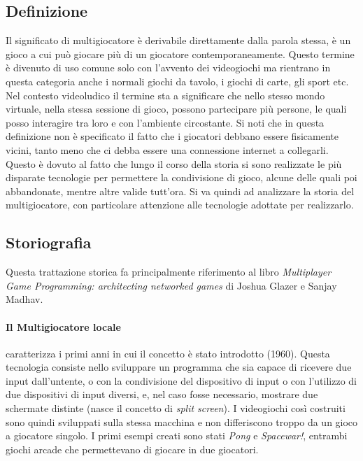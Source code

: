     \subsection{Definizione}\label{subsec:MultiDef}
        Il significato di multigiocatore è derivabile direttamente dalla parola stessa, è un gioco a cui può giocare più di un giocatore contemporaneamente. Questo termine è divenuto 
        di uso comune solo con l'avvento dei videogiochi ma rientrano in questa categoria anche i normali giochi da tavolo, i giochi di carte, gli sport etc.\\
        Nel contesto videoludico il termine sta a significare che nello stesso mondo virtuale, nella stessa sessione di gioco, possono partecipare più persone, le quali posso interagire
        tra loro e con l'ambiente circostante. Si noti che in questa definizione non è specificato il fatto che i giocatori debbano essere fisicamente vicini, tanto meno che ci 
        debba essere una connessione internet a collegarli. Questo è dovuto al fatto che lungo il corso della storia si sono realizzate le più disparate tecnologie per permettere la
        condivisione di gioco, alcune delle quali poi abbandonate, mentre altre valide tutt'ora. Si va quindi ad analizzare la storia del multigiocatore, con particolare attenzione 
        alle tecnologie adottate per realizzarlo.\\
    \subsection{Storiografia}\label{subsec:MultiStoriografia}
        Questa trattazione storica fa principalmente riferimento al libro \textit{Multiplayer Game Programming:  architecting networked games} di Joshua Glazer e Sanjay Madhav\cite{glazer2015}.
        \paragraph{Il Multigiocatore locale} caratterizza i primi anni in cui il concetto è stato introdotto (1960). Questa tecnologia consiste nello sviluppare un programma che sia
            capace di ricevere due input dall'untente, o con la condivisione del dispositivo di input o con l'utilizzo di due dispositivi di input diversi, e, nel caso
            fosse necessario, mostrare due schermate distinte (nasce il concetto di \textit{split screen}). I videogiochi così costruiti sono quindi sviluppati sulla stessa macchina 
            e non differiscono troppo da un gioco a giocatore singolo. I primi esempi creati sono stati \textit{Pong} e \textit{Spacewar!}, entrambi giochi arcade che permettevano di 
            giocare in due giocatori.


